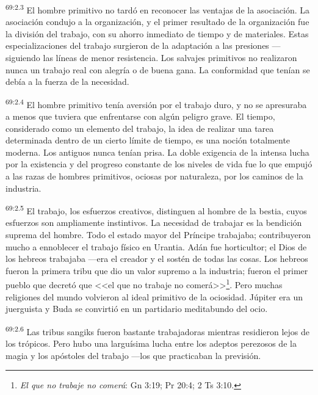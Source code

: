 \par
\textsuperscript{69:2.3} El hombre primitivo no tardó en reconocer las ventajas de la asociación. La asociación condujo a la organización, y el primer resultado de la organización fue la división del trabajo, con su ahorro inmediato de tiempo y de materiales. Estas especializaciones del trabajo surgieron de la adaptación a las presiones ---siguiendo las líneas de menor resistencia. Los salvajes primitivos no realizaron nunca un trabajo real con alegría o de buena gana. La conformidad que tenían se debía a la fuerza de la necesidad.

\par
\textsuperscript{69:2.4} El hombre primitivo tenía aversión por el trabajo duro, y no se apresuraba a menos que tuviera que enfrentarse con algún peligro grave. El tiempo, considerado como un elemento del trabajo, la idea de realizar una tarea determinada dentro de un cierto límite de tiempo, es una noción totalmente moderna. Los antiguos nunca tenían prisa. La doble exigencia de la intensa lucha por la existencia y del progreso constante de los niveles de vida fue lo que empujó a las razas de hombres primitivos, ociosas por naturaleza, por los caminos de la industria.

\par
\textsuperscript{69:2.5} El trabajo, los esfuerzos creativos, distinguen al hombre de la bestia, cuyos esfuerzos son ampliamente instintivos. La necesidad de trabajar es la bendición suprema del hombre. Todo el estado mayor del Príncipe trabajaba; contribuyeron mucho a ennoblecer el trabajo físico en Urantia. Adán fue horticultor; el Dios de los hebreos trabajaba ---era el creador y el sostén de todas las cosas. Los hebreos fueron la primera tribu que dio un valor supremo a la industria; fueron el primer pueblo que decretó que <<el que no trabaje no comerá>>\footnote{\textit{El que no trabaje no comerá}: Gn 3:19; Pr 20:4; 2 Ts 3:10.}. Pero muchas religiones del mundo volvieron al ideal primitivo de la ociosidad. Júpiter era un juerguista y Buda se convirtió en un partidario meditabundo del ocio.

\par
\textsuperscript{69:2.6} Las tribus sangiks fueron bastante trabajadoras mientras residieron lejos de los trópicos. Pero hubo una larguísima lucha entre los adeptos perezosos de la magia y los apóstoles del trabajo ---los que practicaban la previsión.

